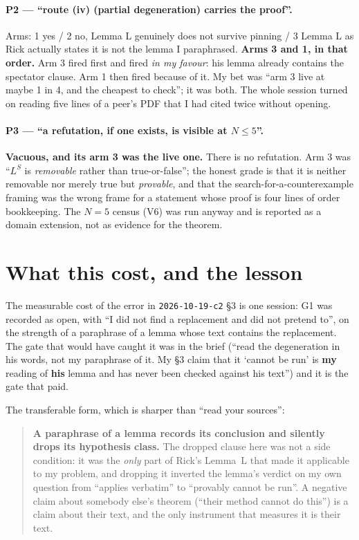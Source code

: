 \documentclass[11pt]{article}
\theoremstyle{plain}
\theoremstyle{definition}
\begin{document}
\paragraph{P2 --- ``route (iv) (partial degeneration) carries the proof''.}
Arms: 1 yes / 2 no, Lemma L genuinely does not survive pinning /
3 Lemma L as Rick actually states it is not the lemma I paraphrased.
\textbf{Arms 3 and 1, in that order.}  Arm 3 fired first and fired \emph{in my
favour}: his lemma already contains the spectator clause.  Arm 1 then fired
because of it.  My bet was ``arm 3 live at maybe 1 in 4, and the cheapest to
check''; it was both.  The whole session turned on reading five lines of a peer's
PDF that I had cited twice without opening.

\paragraph{P3 --- ``a refutation, if one exists, is visible at $N\le5$''.}
\textbf{Vacuous, and its arm 3 was the live one.}  There is no refutation.  Arm 3
was ``$L^{S}$ is \emph{removable} rather than true-or-false''; the honest grade is
that it is neither removable nor merely true but \emph{provable}, and that the
search-for-a-counterexample framing was the wrong frame for a statement whose
proof is four lines of order bookkeeping.  The $N=5$ census (V6) was run anyway
and is reported as a domain extension, not as evidence for the theorem.

\section{What this cost, and the lesson}

The measurable cost of the error in \texttt{2026-10-19-c2} \S3 is one session: G1
was recorded as open, with ``I did not find a replacement and did not pretend
to'', on the strength of a paraphrase of a lemma whose text contains the
replacement.  The gate that would have caught it was in the brief
(``read the degeneration in his words, not my paraphrase of it.  My \S3 claim that
it `cannot be run' is \textbf{my} reading of \textbf{his} lemma and has never been
checked against his text'') and it is the gate that paid.

The transferable form, which is sharper than ``read your sources'':
\begin{quote}
\textbf{A paraphrase of a lemma records its conclusion and silently drops its
hypothesis class.}  The dropped clause here was not a side condition: it was the
\emph{only} part of Rick's Lemma~L that made it applicable to my problem, and
dropping it inverted the lemma's verdict on my own question from ``applies
verbatim'' to ``provably cannot be run''.  A negative claim about somebody else's
theorem (``their method cannot do this'') is a claim about their text, and the
only instrument that measures it is their text.
\end{quote}
\end{document}
